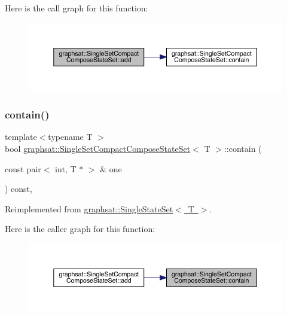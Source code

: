 Here is the call graph for this function\+:\nopagebreak
\begin{figure}[H]
\begin{center}
\leavevmode
\includegraphics[width=350pt]{classgraphsat_1_1_single_set_compact_compose_state_set_a51dc5d12b4a54e6b8d724d0496367b7f_cgraph}
\end{center}
\end{figure}
\mbox{\label{classgraphsat_1_1_single_set_compact_compose_state_set_a0ef077413f338e00cd1420a0edc439fa}} 
\subsubsection{\texorpdfstring{contain()}{contain()}}
{\footnotesize\ttfamily template$<$typename T $>$ \\
bool \mbox{\hyperlink{classgraphsat_1_1_single_set_compact_compose_state_set}{graphsat\+::\+Single\+Set\+Compact\+Compose\+State\+Set}}$<$ T $>$\+::contain (\begin{DoxyParamCaption}\item[{const pair$<$ int, T $\ast$ $>$ \&}]{one }\end{DoxyParamCaption}) const\hspace{0.3cm}{\ttfamily [inline]}, {\ttfamily [virtual]}}



Reimplemented from \mbox{\hyperlink{classgraphsat_1_1_single_state_set_a633187e0b872537595ad313a458b87e1}{graphsat\+::\+Single\+State\+Set$<$ T $>$}}.

Here is the caller graph for this function\+:\nopagebreak
\begin{figure}[H]
\begin{center}
\leavevmode
\includegraphics[width=350pt]{classgraphsat_1_1_single_set_compact_compose_state_set_a0ef077413f338e00cd1420a0edc439fa_icgraph}
\end{center}
\end{figure}


